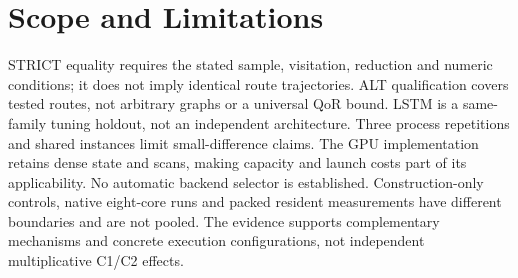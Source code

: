 \section{Scope and Limitations}
STRICT equality requires the stated sample, visitation, reduction and numeric conditions; it does not imply identical route trajectories. ALT qualification covers tested routes, not arbitrary graphs or a universal QoR bound. LSTM is a same-family tuning holdout, not an independent architecture. Three process repetitions and shared instances limit small-difference claims. The GPU implementation retains dense state and scans, making capacity and launch costs part of its applicability. No automatic backend selector is established. Construction-only controls, native eight-core runs and packed resident measurements have different boundaries and are not pooled. The evidence supports complementary mechanisms and concrete execution configurations, not independent multiplicative C1/C2 effects.

